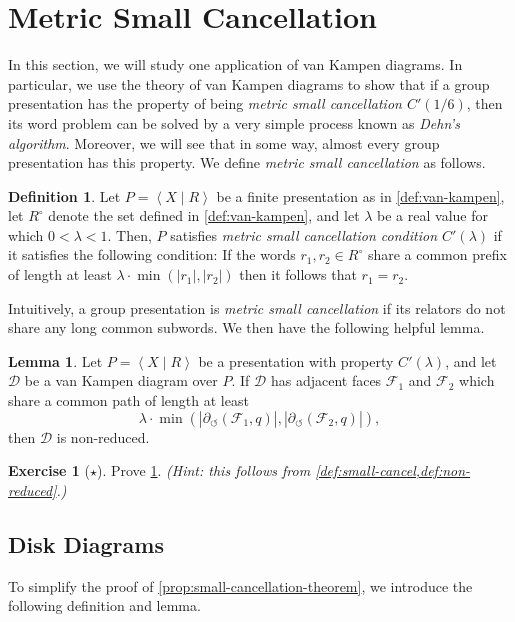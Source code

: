 \documentclass[11pt,a4paper,reqno]{amsart}
\theoremstyle{plain}
\theoremstyle{definition}
\newtheorem{lemma}[theorem]{Lemma}
\newtheorem{definition}[theorem]{Definition}
\theoremstyle{definition}
\newtheorem{exercise}[theorem]{Exercise}
\newcommand\exerciseLevelEasy{$\star$}
\begin{document}
\section{Metric Small Cancellation}\label{sec:metric-small-cancellation}

In this section, we will study one application of van Kampen diagrams.
In particular, we use the theory of van Kampen diagrams to show that if a group presentation has the property of being \emph{metric small cancellation $C'(1/6)$}, then its word problem can be solved by a very simple process known as \emph{Dehn's algorithm}.
Moreover, we will see that in some way, almost every group presentation has this property.
We define \emph{metric small cancellation} as follows.

\begin{definition}\label{def:small-cancel}
  Let $P = \left\langle X \mid R\right\rangle$ be a finite presentation as in \cref{def:van-kampen}, let $R^\circ$ denote the set defined in \cref{def:van-kampen}, and let $\lambda$ be a real value for which $0 < \lambda< 1$.
  Then, $P$ satisfies \emph{metric small cancellation condition $C'(\lambda)$} if it satisfies the following condition:
  If the words $r_1,r_2\in R^\circ$ share a common prefix of length at least $\lambda\cdot \min(|r_1|, |r_2|)$ then it follows that $r_1=r_2$.
\end{definition}

Intuitively, a group presentation is \emph{metric small cancellation} if its relators do not share any long common subwords.
We then have the following helpful lemma.

\begin{lemma}\label{lem:reduced}
Let $P = \left\langle X \mid R \right\rangle$ be a presentation with property $C'(\lambda)$, and let $\mathcal D$ be a van Kampen diagram over $P$.
If $\mathcal D$ has adjacent faces $\mathcal F_1$ and $\mathcal F_2$ which share a common path of length at least
\[
  \lambda \cdot \min \left(
    \left|\partial_\circlearrowleft (\mathcal F_1, q)\right|,
    \left|\partial_\circlearrowleft (\mathcal F_2, q)\right| \right),
\]
then $\mathcal D$ is non-reduced.
\end{lemma}

\begin{exercise}[\exerciseLevelEasy]
Prove \cref{lem:reduced}. \textit{(Hint: this follows from \cref{def:small-cancel,def:non-reduced}.)}
\end{exercise}

\subsection{Disk Diagrams}
To simplify the proof of \cref{prop:small-cancellation-theorem}, we introduce the following definition and lemma.
\end{document}
